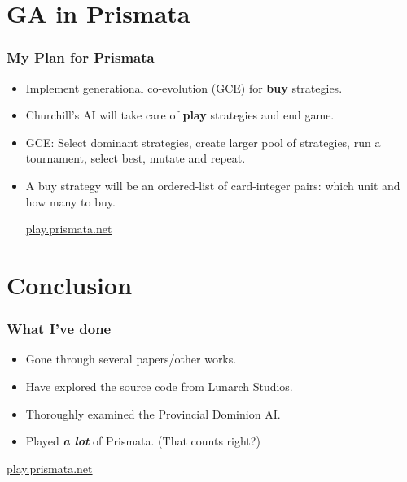 \documentclass[]{beamer}
\begin{document}

\section{GA in Prismata}

\begin{frame}
\frametitle{My Plan for Prismata}
  \begin{itemize}
   \item Implement generational co-evolution (GCE) for \textbf{buy} strategies.
	\item Churchill's AI will take care of \textbf{play} strategies and end game. 
   \item GCE: Select dominant strategies, create larger pool of strategies, run a tournament, select best, mutate and repeat.
   \item A buy strategy will be an ordered-list of card-integer pairs: which unit and how many to buy.\\
   
\begin{center}
 \url{play.prismata.net} \cite{lunarch}
\end{center}



   
  \end{itemize}
  
\end{frame}


\section{Conclusion}

\begin{frame}
\frametitle{What I've done}
  \begin{itemize}
   \item Gone through several papers/other works.
   \item Have explored the source code from Lunarch Studios.
   \item Thoroughly examined the Provincial Dominion AI.
   \item Played \textbf{\textit{a lot}} of Prismata. (That counts right?)
  \end{itemize}

\begin{center}
 \url{play.prismata.net} \cite{lunarch}
\end{center}
  
\end{frame}
\end{document}
